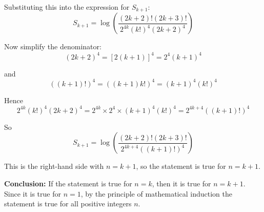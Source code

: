 \documentclass[leqno]{article}
\begin{document}
\begin{enumerate}[
  label=\textbf{\arabic*.},
  leftmargin=*,
  topsep=0pt,
  partopsep=0pt,
  parsep=0pt
]
\begin{djsSolution}
Substituting this into the expression for \(S_{k+1}\):
\[
S_{k+1}
=\log\left(\frac{(2k+2)!(2k+3)!}{2^{4k}(k!)^4(2k+2)^4}\right)
\]

Now simplify the denominator:
\[
(2k+2)^4=[2(k+1)]^4=2^4(k+1)^4
\]

and
\[
((k+1)!)^4=((k+1)k!)^4=(k+1)^4(k!)^4
\]

Hence
\[
2^{4k}(k!)^4(2k+2)^4
=2^{4k}\times 2^4\times (k+1)^4(k!)^4
=2^{4k+4}((k+1)!)^4
\]

So
\[
S_{k+1}
=\log\left(\frac{(2k+2)!(2k+3)!}{2^{4k+4}((k+1)!)^4}\right)
\]

This is the right-hand side with \(n=k+1\), so the statement is true for \(n=k+1\).

\textbf{Conclusion:} If the statement is true for \(n=k\), then it is true for \(n=k+1\). Since it is true for \(n=1\), by the principle of mathematical induction the statement is true for all positive integers \(n\).
\end{djsSolution}


\end{enumerate}
\end{document}
